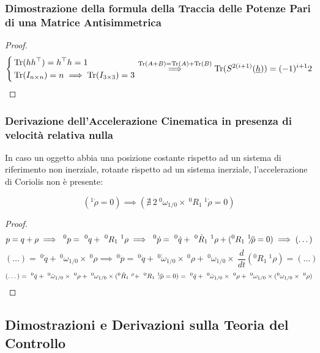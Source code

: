 \subsubsection{Dimostrazione della formula della Traccia delle Potenze Pari di una Matrice Antisimmetrica}

\begin{proof}

\[
	\left\{
	\begin{aligned}
	&\operatorname{Tr}(hh^\top) = h^\top h=1\\
	&\operatorname{Tr}(I_{n\times n}) = n \implies \operatorname{Tr}(I_{3\times 3}) = 3
	\end{aligned}
	\right.\stackrel{\operatorname{Tr}(A+B)=\operatorname{Tr}(A)+\operatorname{Tr}(B)}{\implies} \operatorname{Tr}(S^{2(i+1)}(\underline{h})) = (-1)^{i+1}2
\]

\end{proof}

\subsubsection{Derivazione dell'Accelerazione Cinematica in presenza di velocità relativa nulla}

\begin{prop}

In caso un oggetto abbia una posizione costante rispetto ad un sistema di riferimento non inerziale, rotante rispetto ad un sistema inerziale, l'accelerazione di Coriolis non è presente:

\[
	(^1\dot{\rho}=0)\implies (\nexists\ 2\ ^0\omega_{1/0}\times\ ^0R_1\ ^1\dot{\rho} = 0)
\] 

\end{prop}

\begin{proof}

\[	
	p = q+\rho \implies\ ^0p =\ ^0q+\ ^0R_1\ ^1\rho \implies\ ^0\dot{p} =\ ^0\dot{q} +\ ^0\dot{R}_1\ ^1\rho + (\centernot{^0R_1\ ^1\dot{\rho}=0}) \implies (\dots)
\]
\[	
	(\dots) =\ ^0\dot{q} +\ ^0\omega_{1/0}\times\ ^0\rho \implies\ ^0\ddot{p} =\ ^0\ddot{q} +\ ^0\dot{\omega}_{1/0}\times\ ^0\rho +\ ^0\omega_{1/0}\times\ \frac{d}{dt}(^0R_1\ ^1\rho) = (\dots)
\]
\[
	(\dots) =\ ^0\ddot{q}+\ ^0\dot{\omega}_{1/0}\times\ ^0\rho +\ ^0\omega_{1/0}\times(^0\dot{R}_1\ ^\rho +\ \centernot{^0R_1\ ^1\dot{\rho}=0}) =\ ^0\ddot{q} +\ ^0\dot{\omega}_{1/0}\times\ ^0\rho +\ ^0\omega_{1/0}\times(^0\omega_{1/0}\times\ ^0\rho)
\]

\end{proof}

\subsection{Dimostrazioni e Derivazioni sulla Teoria del Controllo}

